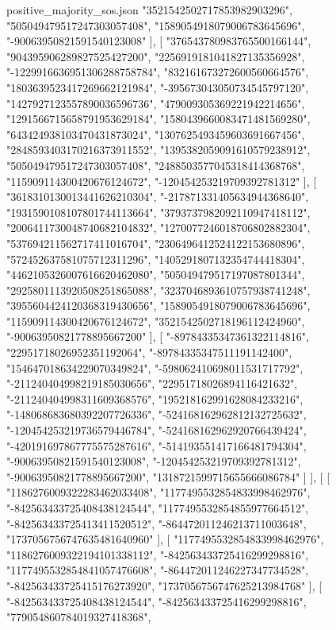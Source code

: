\begin{filecontents*}[overwrite]{positive_majority_sos.json}
    "3521542502717853982903296",
    "505049479517247303057408",
    "1589054918079006783645696",
    "-90063950821591540123008"
   ],
   [
    "376543780983765500166144",
    "904395906289827525427200",
    "2256919181041827135356928",
    "-1229916636951306288758784",
    "832161673272600560664576",
    "1803639523417269662121984",
    "-395673043050734545797120",
    "1427927123557890036596736",
    "479009305369221942214656",
    "1291566715658791953629184",
    "1580439660083471481569280",
    "643424938103470431873024",
    "1307625493459603691667456",
    "2848593403170216373911552",
    "1395382059091610579238912",
    "505049479517247303057408",
    "2488503577045318414368768",
    "115909114300420676124672",
    "-120454253219709392781312"
   ],
   [
    "3618310130013441626210304",
    "-217871331405634944368640",
    "1931590108107801744113664",
    "3793737982092110947418112",
    "2006411730048740682104832",
    "1270077246018706802882304",
    "537694211562717411016704",
    "2306496412524122153680896",
    "572452637581075712311296",
    "1405291807132354744418304",
    "4462105326007616620462080",
    "505049479517197087801344",
    "2925801113920508251865088",
    "3237046893610757938741248",
    "3955604424120368319430656",
    "1589054918079006783645696",
    "115909114300420676124672",
    "3521542502718196112424960",
    "-90063950821778895667200"
   ],
   [
    "-89784335347361322114816",
    "22951718026952351192064",
    "-89784335347511191142400",
    "154647018634229070349824",
    "-598062410698011531717792",
    "-211240404998219185030656",
    "22951718026894116421632",
    "-211240404998311609368576",
    "195218162991628084233216",
    "-148068683680392207726336",
    "-524168162962812132725632",
    "-120454253219736579446784",
    "-524168162962920766439424",
    "-420191697867775575287616",
    "-514193551417166481794304",
    "-90063950821591540123008",
    "-120454253219709392781312",
    "-90063950821778895667200",
    "1318721599715655666086784"
   ]
  ],
  [
   [
    "1186276009322283462033408",
    "1177495532854833998462976",
    "-842563433725408438124544",
    "1177495532854855977664512",
    "-842563433725413411520512",
    "-864472011246213711003648",
    "1737056756747635481640960"
   ],
   [
    "1177495532854833998462976",
    "1186276009322194101338112",
    "-842563433725416299298816",
    "1177495532854841057476608",
    "-864472011246227347734528",
    "-842563433725415176273920",
    "1737056756747625213984768"
   ],
   [
    "-842563433725408438124544",
    "-842563433725416299298816",
    "779054860784019327418368",

\end{filecontents*}
